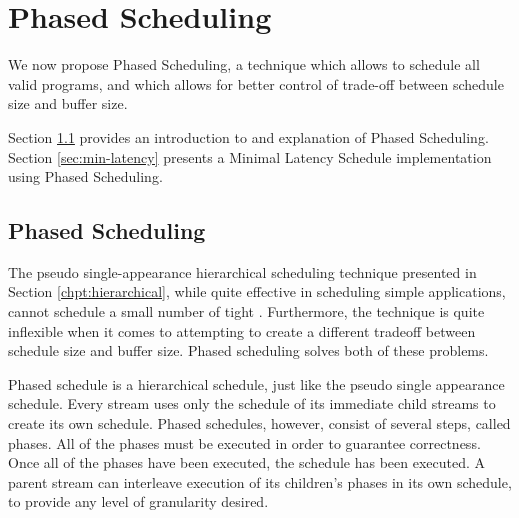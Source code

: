 \section{Phased Scheduling}
\label{chpt:phased}

We now propose Phased Scheduling, a technique which allows to
schedule all valid {\StreamIt} programs, and which allows for
better control of trade-off between schedule size and buffer size.

Section \ref{sec:phased:intro} provides an introduction to and
explanation of Phased Scheduling. Section \ref{sec:min-latency}
presents a Minimal Latency Schedule implementation using Phased
Scheduling.

\subsection{Phased Scheduling}
\label{sec:phased:intro}

The pseudo single-appearance hierarchical scheduling technique
presented in Section \ref{chpt:hierarchical}, while quite
effective in scheduling simple applications, cannot schedule a
small number of tight {{\feedbackloops}}. Furthermore, the
technique is quite inflexible when it comes to attempting to
create a different tradeoff between schedule size and buffer size.
Phased scheduling solves both of these problems.

Phased schedule is a hierarchical schedule, just like the pseudo
single appearance schedule. Every stream uses only the schedule of
its immediate child streams to create its own schedule. Phased
schedules, however, consist of several steps, called phases. All
of the phases must be executed in order to guarantee correctness.
Once all of the phases have been executed, the schedule has been
executed. A parent stream can interleave execution of its
children's phases in its own schedule, to provide any level of
granularity desired.


